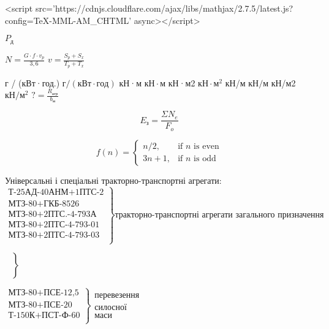 <script src='https://cdnjs.cloudflare.com/ajax/libs/mathjax/2.7.5/latest.js?config=TeX-MML-AM_CHTML' async></script>



\(P_д\)

\displaystyle \(N=\frac{G \cdot f \cdot v_p}{3,6}\)
\(\displaystyle v=\frac{S_p+S_x}{T_p+T_x}\)


г / (кВт·год.) \( г / (кВт \cdot год) \)
кН·м           \( кН \cdot м \)
кН·м2          \(кН \cdot м^2\)
кН/м           \(кН/м\)
кН/м2           \(кН/м^2\)
\( \displaystyle ?=\frac{R_{агр}}{b_м} \) 

$$
E_{з}=\frac{\Sigma N_e}{F_o}
$$

\(  \)
$$
f(n) = \begin{cases} n/2, & \mbox{if } n\mbox{ is even} \\ 3n+1, & \mbox{if } n\mbox{ is odd} \end{cases}
$$

Універсальні і спеціальні тракторно-транспортні агрегати:
$$
\left.\begin{array}{l}
\mbox{Т-25АД-40АНМ+1ПТС-2}\\
\mbox{МТЗ-80+ГКБ-8526}\\
\mbox{МТЗ-80+2ПТС.-4-793А}\\
\mbox{МТЗ-80+2ПТС-4-793-01}\\
\mbox{МТЗ-80+2ПТС-4-793-03}\\
\end{array}\right\}
\mbox{тракторно-транспортні агрегати загального призначення}
$$

\(
\left.\begin{array}{l}
\mbox{}\\
\mbox{}\\
\mbox{}\\
\mbox{}\\
\mbox{}\\
\end{array}\right\}
\begin{array}{l}
\mbox{} \\
\mbox{} \\
\mbox{}
\end{array}
\)

\(
\left.\begin{array}{l}
\mbox{МТЗ-80+ПСЕ-12,5}\\
\mbox{МТЗ-80+ПСЕ-20}\\
\mbox{Т-150К+ПСТ-Ф-60}\\
\end{array}\right\}
\begin{array}{l}
\mbox{перевезення} \\
\mbox{силосної} \\
\mbox{маси}
\end{array}
\)

